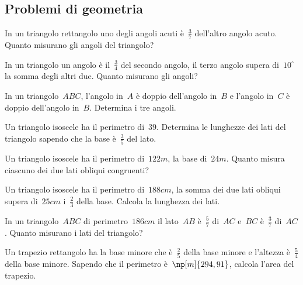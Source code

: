 \subsection{Problemi di geometria}
\begin{multicols}{2}
\begin{esercizio}[\Ast]
\label{ese:16.82}
In un triangolo rettangolo uno degli angoli acuti è~$\frac{3}{7}$ dell'altro angolo acuto. Quanto misurano gli angoli del triangolo?
\end{esercizio}

\begin{esercizio}[\Ast]
\label{ese:16.83}
In un triangolo un angolo è il~$\frac{3}{4}$ del secondo angolo, il terzo angolo supera di~$10^{\circ}$ la somma degli altri due. Quanto misurano gli angoli?
\end{esercizio}

\begin{esercizio}
\label{ese:16.84}
In un triangolo~$ABC$, l'angolo in~$A$ è doppio dell'angolo in~$B$ e l'angolo in~$C$ è doppio dell'angolo in~$B$. Determina i tre angoli.
\end{esercizio}

\begin{esercizio}
\label{ese:16.85}
Un triangolo isoscele ha il perimetro di~$39$. Determina le lunghezze dei lati del triangolo sapendo che la base è~$\frac{3}{5}$ del lato.
\end{esercizio}

\begin{esercizio}[\Ast]
\label{ese:16.86}
Un triangolo isoscele ha il perimetro di~$122\unit{m}$, la base di~$24\unit{m}$. Quanto misura ciascuno dei due lati obliqui congruenti?
\end{esercizio}

\begin{esercizio}[\Ast]
\label{ese:16.87}
Un triangolo isoscele ha il perimetro di~$188\unit{cm}$, la somma dei due lati obliqui supera di~$25\unit{cm}$ i~$\frac{2}{3}$ della base. Calcola la lunghezza dei lati.
\end{esercizio}

\begin{esercizio}[\Ast]
\label{ese:16.88}
In un triangolo~$ABC$ di perimetro~$186\unit{cm}$ il lato~$AB$ è~$\frac{5}{7}$ di~$AC$ e~$BC$ è~$\frac{3}{7}$ di~$AC$. Quanto misurano i lati del triangolo?
\end{esercizio}

\begin{esercizio}[\Ast]
\label{ese:16.89}
Un trapezio rettangolo ha la base minore che è~$\frac{2}{5}$ della base minore e l'altezza è~$\frac{5}{4}$ della base minore. Sapendo che il perimetro è~$\np[m]{294,91}$, calcola l'area del trapezio.
\end{esercizio}


\end{multicols}
